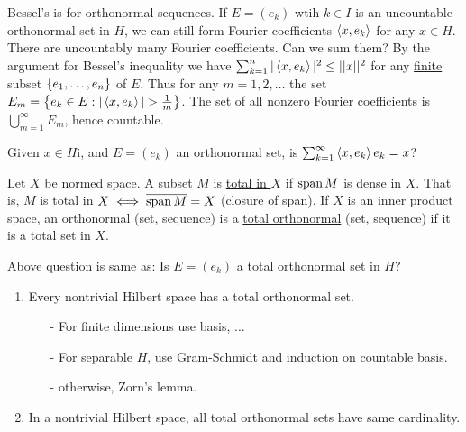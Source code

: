 \documentclass[]{article}
\begin{document}
\begin{note}
	Bessel's is for orthonormal sequences. If $E = (e_k)$ wtih $k\in I$ is an uncountable orthonormal set in $H$, we can still form Fourier coefficients $\left\langle x,e_k \right\rangle$ for any $x\in H$. There are uncountably many Fourier coefficients. Can we sum them?
	By the argument for Bessel's inequality we have $\sum_{k=1}^n |\left\langle x,e_k \right\rangle|^2 \leq ||x||^2$ for any \ul{finite} subset $\left\{ e_1,\dots,e_n \right\}$ of $E$.
	Thus for any $m=1,2,\dots$ the set $E_m = \setc{e_k\in E}{|\gen{x,e_k}|>\frac1m}$.
	The set of all nonzero Fourier coefficients is $\bigcup_{m=1}^\infty E_m$, hence countable.
\end{note}

Given $x\in H$i, and $E=(e_k)$ an orthonormal set, is $\sum_{k=1}^\infty \left\langle x,e_k \right\rangle e_k = x$?

\begin{definition}
	Let $X$ be normed space. A subset $M$ is \ul{total in $X$} if $\text{span}\,M$ is dense in $X$. That is, $M$ is total in $X\iff\overline{\text{span}\,M} = X$ (closure of span).
		If $X$ is an inner product space, an orthonormal (set, sequence) is a \ul{total orthonormal} (set, sequence) if it is a total set in $X$.
\end{definition}
Above question is same as: Is $E=(e_k)$ a total orthonormal set in $H$?

\begin{enumerate}
	\item Every nontrivial Hilbert space has a total orthonormal set.
		\begin{enumerate}
			\item[-] For finite dimensions use basis, $\dots$
			\item[-] For separable $H$, use Gram-Schmidt and induction on countable basis.
			\item[-] otherwise, Zorn's lemma.
		\end{enumerate}
	\item In a nontrivial Hilbert space, all total orthonormal sets have same cardinality.
\end{enumerate}
\end{document}
